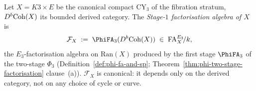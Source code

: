 \begin{definition}
\label{def:cy-c-beyond-stage-1-fa}
Let $X = K3 \times E$ be the canonical compact CY$_3$ of the fibration
stratum, $D^b\mathrm{Coh}(X)$ its bounded derived category. The
\emph{Stage-$1$ factorisation algebra of $X$} is
\[
 \mathcal F_X
 \;:=\; \PhiFA_3(D^b\Coh(X))
 \;\in\; \mathrm{FA}^{E_3}_{X}\!/k,
\]
the $E_3$-factorisation algebra on $\mathrm{Ran}(X)$ produced by the
first stage $\PhiFA_3$ of the two-stage $\Phi_3$
(Definition~\ref{def:phi-fa-and-sp};
Theorem~\ref{thm:phi-two-stage-factorisation} clause~(a)). $\mathcal F_X$
is canonical: it depends only on the derived category, not on any
choice of cycle or curve.
\end{definition}

